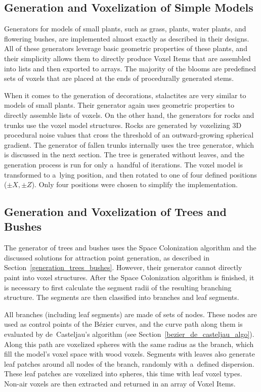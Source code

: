 \subsection{Generation and Voxelization of Simple Models}

Generators for models of small plants, such as grass, plants, water plants, and flowering bushes, are implemented almost exactly as described in their designs. All of these generators leverage basic geometric properties of these plants, and their simplicity allows them to directly produce Voxel Items that are assembled into lists and then exported to arrays. The majority of the blooms are predefined sets of voxels that are placed at the ends of procedurally generated stems.

When it comes to the generation of decorations, stalactites are very similar to models of small plants. Their generator again uses geometric properties to directly assemble lists of voxels. On the other hand, the generators for rocks and trunks use the voxel model structures. Rocks are generated by voxelizing 3D procedural noise values that cross the threshold of an outward-growing spherical gradient. The generator of fallen trunks internally uses the tree generator, which is discussed in the next section. The tree is generated without leaves, and the generation process is run for only a~handful of iterations. The voxel model is transformed to a~lying position, and then rotated to one of four defined positions ($\pm X, \pm Z$). Only four positions were chosen to simplify the implementation.

\subsection{Generation and Voxelization of Trees and Bushes}

The generator of trees and bushes uses the Space Colonization algorithm and the discussed solutions for attraction point generation, as described in Section~\ref{generation_trees_bushes}. However, their generator cannot directly paint into voxel structures. After the Space Colonization algorithm is finished, it is necessary to first calculate the segment radii of the resulting branching structure. The segments are then classified into branches and leaf segments.

All branches (including leaf segments) are made of sets of nodes. These nodes are used as control points of the Bézier curves, and the curve path along them is evaluated by de~Casteljau's algorithm (see Section~\ref{bezier_de_casteljau_algo}). Along this path are voxelized spheres with the same radius as the branch, which fill the model's voxel space with wood voxels. Segments with leaves also generate leaf patches around all nodes of the branch, randomly with a~defined dispersion. These leaf patches are voxelized into spheres, this time with leaf voxel types. Non-air voxels are then extracted and returned in an array of Voxel Items.

